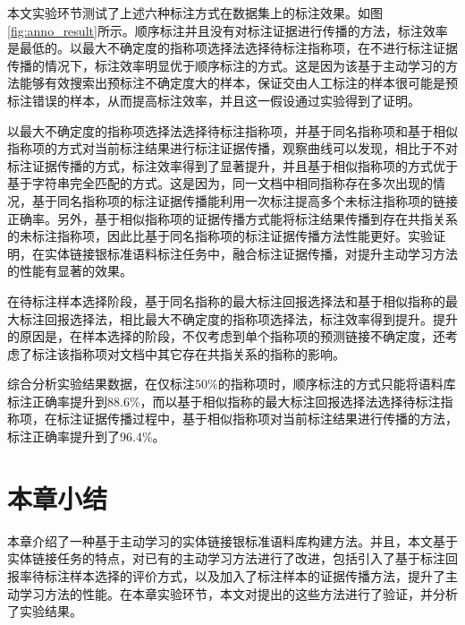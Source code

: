本文实验环节测试了上述六种标注方式在数据集上的标注效果。如图\ref{fig:anno_result}所示。顺序标注并且没有对标注证据进行传播的方法，标注效率是最低的。以最大不确定度的指称项选择法选择待标注指称项，在不进行标注证据传播的情况下，标注效率明显优于顺序标注的方式。这是因为该基于主动学习的方法能够有效搜索出预标注不确定度大的样本，保证交由人工标注的样本很可能是预标注错误的样本，从而提高标注效率，并且这一假设通过实验得到了证明。

以最大不确定度的指称项选择法选择待标注指称项，并基于同名指称项和基于相似指称项的方式对当前标注结果进行标注证据传播，观察曲线可以发现，相比于不对标注证据传播的方式，标注效率得到了显著提升，并且基于相似指称项的方式优于基于字符串完全匹配的方式。这是因为，同一文档中相同指称存在多次出现的情况，基于同名指称项的标注证据传播能利用一次标注提高多个未标注指称项的链接正确率。另外，基于相似指称项的证据传播方式能将标注结果传播到存在共指关系的未标注指称项，因此比基于同名指称项的标注证据传播方法性能更好。实验证明，在实体链接银标准语料标注任务中，融合标注证据传播，对提升主动学习方法的性能有显著的效果。

在待标注样本选择阶段，基于同名指称的最大标注回报选择法和基于相似指称的最大标注回报选择法，相比最大不确定度的指称项选择法，标注效率得到提升。提升的原因是，在样本选择的阶段，不仅考虑到单个指称项的预测链接不确定度，还考虑了标注该指称项对文档中其它存在共指关系的指称的影响。

综合分析实验结果数据，在仅标注50\%的指称项时，顺序标注的方式只能将语料库标注正确率提升到88.6\%，而以基于相似指称的最大标注回报选择法选择待标注指称项，在标注证据传播过程中，基于相似指称项对当前标注结果进行传播的方法，标注正确率提升到了96.4\%。

\section{本章小结}
本章介绍了一种基于主动学习的实体链接银标准语料库构建方法。并且，本文基于实体链接任务的特点，对已有的主动学习方法进行了改进，包括引入了基于标注回报率待标注样本选择的评价方式，以及加入了标注样本的证据传播方法，提升了主动学习方法的性能。在本章实验环节，本文对提出的这些方法进行了验证，并分析了实验结果。